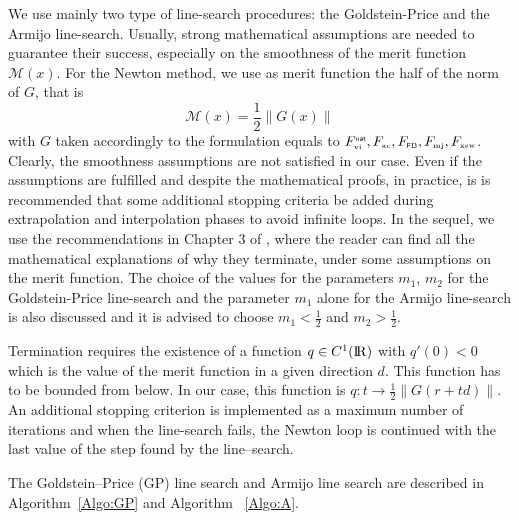 We use mainly two type of line-search procedures: the Goldstein-Price and the Armijo line-search. Usually, strong mathematical assumptions are needed to guarantee their success, especially on the smoothness of the merit function $\mathcal M(x)$.  For the Newton method, we use as merit function the half of the norm of $G$, that is
\begin{equation}
  \label{eq:2}
  \mathcal M(x) = \frac 1 2 \|G(x)\|
\end{equation}
with $G$ taken accordingly to the formulation equals to $F^{\hbox{\sf \tiny{nat}}}_{\hbox{\tiny{vi}}}, F_{\hbox{\tiny{ac}}}, F_{{\hbox{\tiny{\textsf FB}}}}, F_{{\hbox{\tiny{mj}}}}, F_{{\hbox{\tiny{xsw}}}}$. Clearly, the smoothness assumptions are not satisfied in our case. Even if the assumptions are fulfilled and despite the
mathematical proofs, in practice, is is recommended that some additional stopping criteria
be added during extrapolation and interpolation phases to avoid
infinite loops. In the sequel, we use the recommendations in  Chapter 3 of
\cite{Bonnans.ea2003}, where the reader can find all the mathematical
explanations of why they terminate, under some assumptions on the merit
function. The choice of the values for the parameters $m_1$, $m_2$ for the
Goldstein-Price line-search and the parameter $m_1$ alone for the Armijo
line-search is also discussed and it is advised to choose $m_1 < \frac{1}{2}$
and $m_2 > \frac{1}{2}$.

Termination requires the existence of a function $q \in C^1(\mathrm{I\!R})$ with $q'(0) < 0$ which is the value of the merit function in a given direction $d$. This function has to be 
bounded from below. In our case, this function is
$q : t \to \frac{1}{2} \|G(r + t d)\|$. An
additional stopping criterion is implemented as a maximum number of iterations and when the
line-search fails, the Newton loop is continued with the last value of the step found by the line--search.

The Goldstein--Price (GP) line search and Armijo line search are described in Algorithm~\ref{Algo:GP} and Algorithm ~\ref{Algo:A}.



